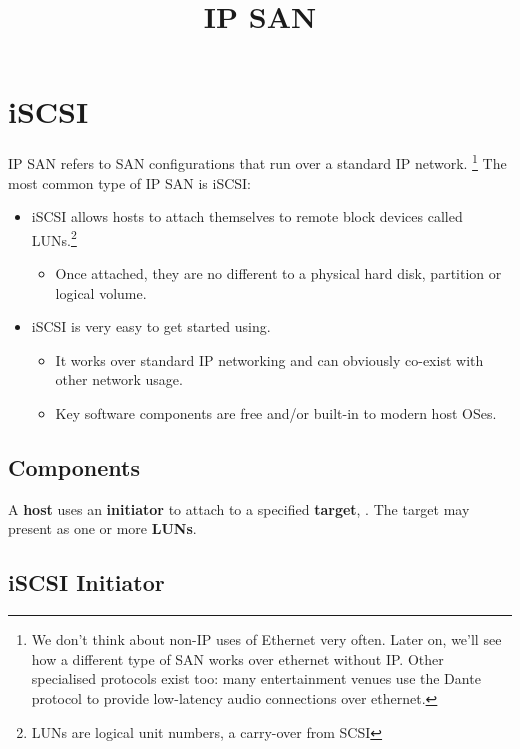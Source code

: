 \documentclass[slides]{pgnotes}
\title{IP SAN}
\begin{document}
\maketitle

\section{iSCSI}
\label{sec:iscsi}

IP SAN refers to SAN configurations that run over a standard IP network.
\footnote{We don't think about non-IP uses of Ethernet very often. Later
  on, we'll see how a different type of SAN works over ethernet without
  IP. Other specialised protocols exist too: many entertainment venues
  use the Dante protocol to provide low-latency audio connections over
  ethernet.} The most common type of IP SAN is iSCSI:

\begin{itemize}
\item
  iSCSI allows hosts to attach themselves to remote block devices called
  LUNs.\footnote{LUNs are logical unit numbers, a carry-over from SCSI}
  \begin{itemize}
  \item Once attached, they are no different to a physical hard disk, partition or logical volume.
  \end{itemize}
\item
  iSCSI is very easy to get started using.
  \begin{itemize}
  \item It works over standard IP networking and can obviously co-exist with other network usage.
  \item Key software components are free and/or built-in to modern host OSes.
  \end{itemize}
\end{itemize}

\subsection{Components}
\label{sec:components}

A \textbf{host} uses an \textbf{initiator} to attach to a specified
\textbf{target}, . The target may present as one or more \textbf{LUNs}.


\subsection{iSCSI Initiator}
\label{sec:iscsi-initiator}
\end{document}
